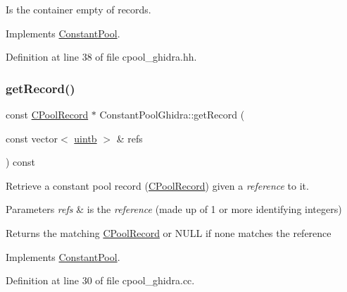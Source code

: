Is the container empty of records. 



Implements \mbox{\hyperlink{class_constant_pool_a22bef84ddc137d871c05a55c5757a3e1}{Constant\+Pool}}.



Definition at line 38 of file cpool\+\_\+ghidra.\+hh.

\mbox{\label{class_constant_pool_ghidra_ac4520027014d9d9c6cd6e12b17488f02}} 
\subsubsection{\texorpdfstring{getRecord()}{getRecord()}}
{\footnotesize\ttfamily const \mbox{\hyperlink{class_c_pool_record}{C\+Pool\+Record}} $\ast$ Constant\+Pool\+Ghidra\+::get\+Record (\begin{DoxyParamCaption}\item[{const vector$<$ \mbox{\hyperlink{types_8h_a2db313c5d32a12b01d26ac9b3bca178f}{uintb}} $>$ \&}]{refs }\end{DoxyParamCaption}) const\hspace{0.3cm}{\ttfamily [virtual]}}



Retrieve a constant pool record (\mbox{\hyperlink{class_c_pool_record}{C\+Pool\+Record}}) given a {\itshape reference} to it. 


\begin{DoxyParams}{Parameters}
{\em refs} & is the {\itshape reference} (made up of 1 or more identifying integers) \\
\hline
\end{DoxyParams}
\begin{DoxyReturn}{Returns}
the matching \mbox{\hyperlink{class_c_pool_record}{C\+Pool\+Record}} or N\+U\+LL if none matches the reference 
\end{DoxyReturn}


Implements \mbox{\hyperlink{class_constant_pool_ac17df35ff1376311f62912d29bf26cad}{Constant\+Pool}}.



Definition at line 30 of file cpool\+\_\+ghidra.\+cc.

